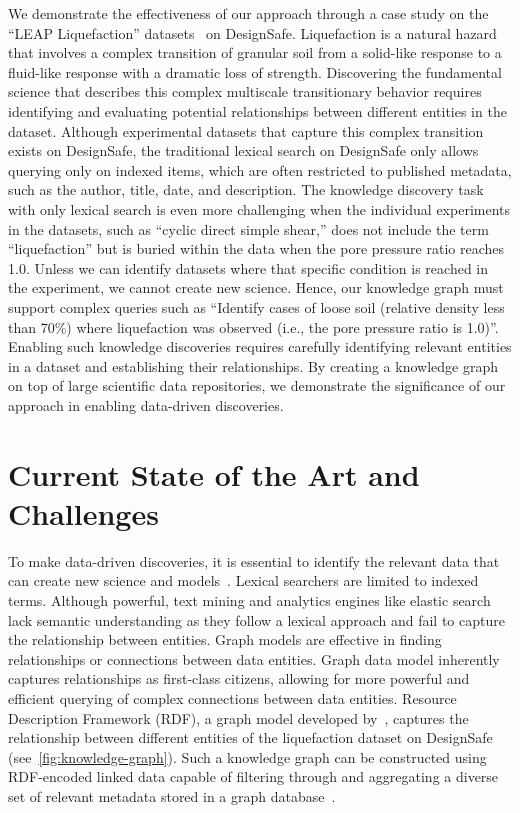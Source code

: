 \documentclass[acmsmall]{acmart}
\begin{document}
We demonstrate the effectiveness of our approach through a case study on the ``LEAP Liquefaction'' datasets~\cite{lbibb22_1, lbibb22_2, lbibb22_3, elghoraiby21_1, elghoraiby21_2, elghoraiby21_3, escoffier23, huang23, ma23, madabhushi23, manandhar23, mitsu23, stone23, takemura23, ueda23, zeghal23} on DesignSafe.
Liquefaction is a natural hazard that involves a complex transition of granular soil from a solid-like response to a fluid-like response with a dramatic loss of strength. 
Discovering the fundamental science that describes this complex multiscale transitionary behavior requires identifying and evaluating potential relationships between different entities in the dataset. 
Although experimental datasets that capture this complex transition exists on DesignSafe, the traditional lexical search on DesignSafe only allows querying only on indexed items, which are often restricted to published metadata, such as the author, title, date, and description.  
The knowledge discovery task with only lexical search is even more challenging when the individual experiments in the datasets, such as ``cyclic direct simple shear,'' does not include the term ``liquefaction'' but is buried within the data when the pore pressure ratio reaches 1.0.
Unless we can identify datasets where that specific condition is reached in the experiment, we cannot create new science. 
Hence, our knowledge graph must support complex queries such as ``Identify cases of loose soil (relative density less than 70\%) where liquefaction was observed (i.e., the pore pressure ratio is 1.0)''.
Enabling such knowledge discoveries requires carefully identifying relevant entities in a dataset and establishing their relationships. 
By creating a knowledge graph on top of large scientific data repositories, we demonstrate the significance of our approach in enabling data-driven discoveries.

\section{Current State of the Art and Challenges}
\label{sec:org14d1606}
To make data-driven discoveries, it is essential to identify the relevant data that can create new science and models~\cite{buildit}. 
Lexical searchers are limited to indexed terms. Although powerful, text mining and analytics engines like elastic search~\cite{kononenko2014mining} lack semantic understanding as they follow a lexical approach and fail to capture the relationship between entities. 
Graph models are effective in finding relationships or connections between data entities. 
Graph data model inherently captures relationships as first-class citizens, allowing for more powerful and efficient querying of complex connections between data entities.
Resource Description Framework (RDF), a graph model developed by~\cite{BernersLee2001TheSW}, captures the relationship between different entities of the liquefaction dataset on DesignSafe (see~\cref{fig:knowledge-graph}). 
Such a knowledge graph can be constructed using RDF-encoded linked data capable of filtering through and aggregating a diverse set of relevant metadata stored in a graph database~\cite{JWS-facets, kgreview}. 
\end{document}
